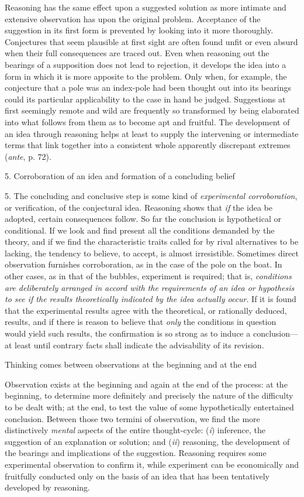 \documentclass[letterpaper]{book}
\begin{document}
Reasoning has the same effect upon a suggested solution as more intimate
and extensive observation has upon the original problem. Acceptance of
the suggestion in its first form is prevented by looking into it more
thoroughly. Conjectures that seem plausible at first sight are often
found unfit or even absurd when their full consequences are traced out.
Even when reasoning out the bearings of a supposition does not lead to
rejection, it develops the idea into a form in which it is more apposite
to the problem. Only when, for example, the conjecture that a pole was
an index-pole had been thought out into its bearings could its
particular applicability to the case in hand be judged. Suggestions at
first seemingly remote and wild are frequently so transformed by being
elaborated into what follows from them as to become apt and fruitful.
The development of an idea through reasoning helps at least to supply
the intervening or intermediate terms that link together into a
consistent whole apparently discrepant extremes (\emph{ante}, p.
72).

5. Corroboration of an idea and formation of a concluding belief

5. The concluding and conclusive step is some kind of \emph{experimental
corroboration}, or verification, of the conjectural idea. Reasoning
shows that \emph{if} the idea be adopted, certain consequences follow.
So far the conclusion is hypothetical or conditional. If we look and
find present all the conditions demanded by the theory, and if we find
the characteristic traits called for by rival alternatives to be
lacking, the tendency to believe, to accept, is almost irresistible.
Sometimes direct observation furnishes corroboration, as in the case of
the pole on the boat. In other cases, as in that of the bubbles,
experiment is required; that is, \emph{conditions are deliberately
arranged in accord with the requirements of an idea or hypothesis to see
if the results theoretically indicated by the idea actually occur}. If
it is found that the experimental results agree with the theoretical, or
rationally deduced, results, and if there is reason to believe that
\emph{only} the conditions in question would yield such results, the
confirmation is so strong as to induce a conclusion---at least until
contrary facts shall indicate the advisability of its revision.

Thinking comes between observations at the beginning and at the end

Observation exists at the beginning and again at the end of the process:
at the beginning, to determine more definitely and precisely the nature
of the difficulty to be dealt with; at the end, to test the value of
some hypothetically entertained conclusion. Between those two termini of
observation, we find the more distinctively \emph{mental} aspects of the
entire thought-cycle: (\emph{i}) inference, the suggestion of an
explanation or solution; and (\emph{ii}) reasoning, the development of
the bearings and implications of the suggestion. Reasoning requires some
experimental observation to confirm it, while experiment can be
economically and fruitfully conducted
only
on the basis of an idea that has been tentatively developed by
reasoning.
\end{document}
